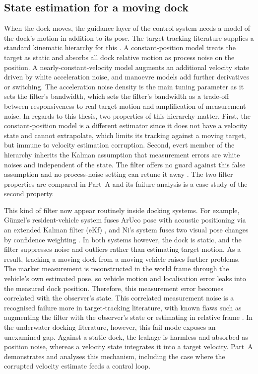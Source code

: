 \subsection{State estimation for a moving dock}
\label{sec:lit-estimation}

When the dock moves, the guidance layer of the control system needs a model of the dock's motion in addition to its pose. The target-tracking literature supplies a standard kinematic hierarchy for this \cite{barshalom2001estimation}. A constant-position model treats the target as static and absorbs all dock relative motion as process noise on the position. A nearly-constant-velocity model augments an additional velocity state driven by white acceleration noise, and manoevre models add further derivatives or switching. The acceleration noise density is the main tuning parameter as it sets the filter's bandwidth, which sets the filter's bandwidth as a trade-off between responsiveness to real target motion and amplification of measurement noise. In regards to this thesis, two properties of this hierarchy matter. First, the constant-position model is a different estimator since it does not have a velocity state and cannot extrapolate, which limits its tracking against a moving target, but immune to velocity estimation corruption. Second, evert member of the hierarchy inherits the Kalman assumption that measurement errors are white noises and independent of the state. The filter offers no guard against this false assumption and no process-noise setting can retune it away \cite{barshalom2001estimation}. The two filter properties are compared in Part~A and its failure analysis is a case study of the second property.

This kind of filter now appear routinely inside docking systems. For example, G\"unzel's resident-vehicle system fuses ArUco pose with acoustic positioning via an extended Kalman filter (eKf) \cite{gunzel2026docking}, and Ni's system fuses two visual pose changes by confidence weighting \cite{ni2025vision}. In both systems however, the dock is static, and the filter suppresses noise and outliers rather than estimating target motion. As a result, tracking a moving dock from a moving vehicle raises further problems. The marker measurement is reconstructed in the world frame through the vehicle's own estimated pose, so vehicle motion and localisation error leaks into the measured dock position. Therefore, this measurement error becomes correlated with the observer's state. This correlated measurement noise is a recognised failure more in target-tracking literature, with known flaws such as augmenting the filter with the observer's state or estimating in relative frame \cite{barshalom2001estimation}. In the underwater docking literature, however, this fail mode exposes an unexamined gap. Against a static dock, the leakage is harmless and absorbed as position noise, whereas a velocity state integrates it into a target velocity. Part~A demonstrates and analyses this mechanism, including the case where the corrupted velocity estimate feeds a control loop.
